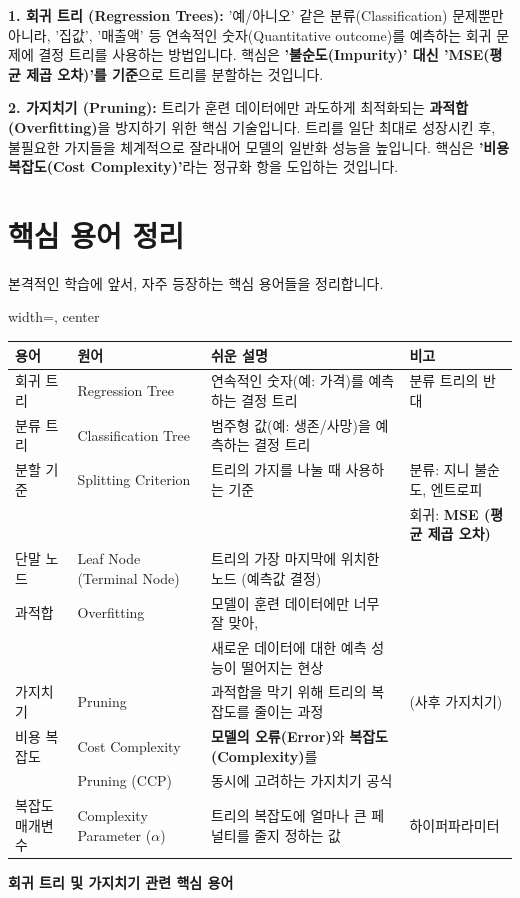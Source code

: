 \documentclass[11pt,a4paper]{book}
\providecommand{\captionof}[2]{\textbf{#2}}
\theoremstyle{definition}
\begin{document}
\begin{boxSummary}
    \textbf{1. 회귀 트리 (Regression Trees):}
    '예/아니오' 같은 분류(Classification) 문제뿐만 아니라, '집값', '매출액' 등 연속적인 숫자(Quantitative outcome)를 예측하는 회귀 문제에 결정 트리를 사용하는 방법입니다. 핵심은 \textbf{'불순도(Impurity)' 대신 'MSE(평균 제곱 오차)'를 기준}으로 트리를 분할하는 것입니다.

    \textbf{2. 가지치기 (Pruning):}
    트리가 훈련 데이터에만 과도하게 최적화되는 \textbf{과적합(Overfitting)}을 방지하기 위한 핵심 기술입니다. 트리를 일단 최대로 성장시킨 후, 불필요한 가지들을 체계적으로 잘라내어 모델의 일반화 성능을 높입니다. 핵심은 \textbf{'비용 복잡도(Cost Complexity)'}라는 정규화 항을 도입하는 것입니다.
\end{boxSummary}


\section{핵심 용어 정리}

본격적인 학습에 앞서, 자주 등장하는 핵심 용어들을 정리합니다.

\begin{adjustbox}{width=\textwidth, center}
\begin{tabular}{l l l l}
\toprule
\textbf{용어} & \textbf{원어} & \textbf{쉬운 설명} & \textbf{비고} \\
\midrule
회귀 트리 & Regression Tree & 연속적인 숫자(예: 가격)를 예측하는 결정 트리 & 분류 트리의 반대 \\
분류 트리 & Classification Tree & 범주형 값(예: 생존/사망)을 예측하는 결정 트리 & \\
분할 기준 & Splitting Criterion & 트리의 가지를 나눌 때 사용하는 기준 & 분류: 지니 불순도, 엔트로피 \\
& & & 회귀: \textbf{MSE (평균 제곱 오차)} \\
단말 노드 & Leaf Node (Terminal Node) & 트리의 가장 마지막에 위치한 노드 (예측값 결정) & \\
과적합 & Overfitting & 모델이 훈련 데이터에만 너무 잘 맞아, \\
& & 새로운 데이터에 대한 예측 성능이 떨어지는 현상 & \\
가지치기 & Pruning & 과적합을 막기 위해 트리의 복잡도를 줄이는 과정 & (사후 가지치기) \\
비용 복잡도 & Cost Complexity & \textbf{모델의 오류(Error)}와 \textbf{복잡도(Complexity)}를 \\
& Pruning (CCP) & 동시에 고려하는 가지치기 공식 & \\
복잡도 매개변수 & Complexity Parameter ($\alpha$) & 트리의 복잡도에 얼마나 큰 페널티를 줄지 정하는 값 & 하이퍼파라미터 \\
\bottomrule
\end{tabular}
\end{adjustbox}
\captionof{table}{회귀 트리 및 가지치기 관련 핵심 용어}
\label{tab:terms}
\end{document}
